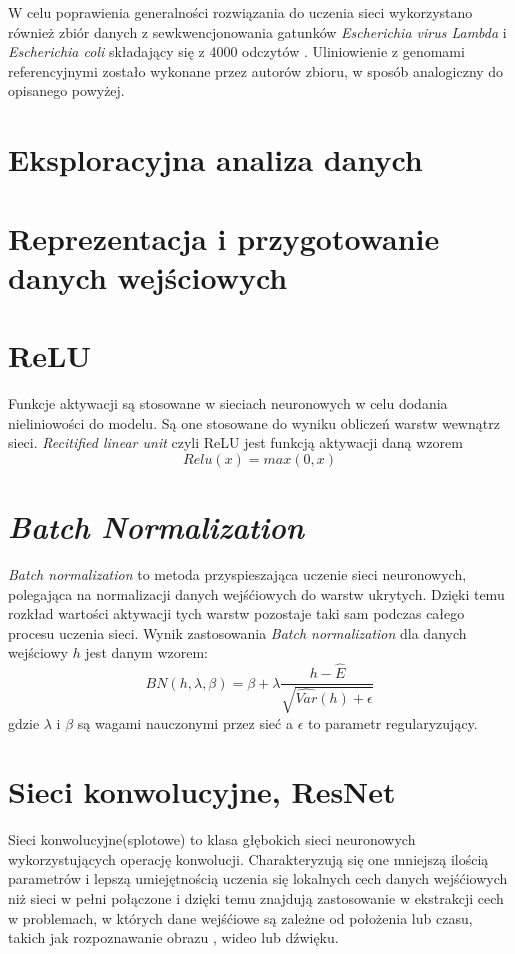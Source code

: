 \documentclass[a4paper,11pt,twoside]{report}
\theoremstyle{definition}
\begin{document}
W celu poprawienia generalności rozwiązania do uczenia sieci wykorzystano również zbiór danych z sewkwencjonowania gatunków \textit{Escherichia virus Lambda} i \textit{Escherichia coli} składający się z 4000 odczytów \cite{chironData}. Uliniowienie z genomami referencyjnymi zostało wykonane przez autorów zbioru, w sposób analogiczny do opisanego powyżej.

\section*{Eksploracyjna analiza danych}

\section*{Reprezentacja i przygotowanie danych wejściowych}

\section{ReLU}

Funkcje aktywacji są stosowane w sieciach neuronowych w celu dodania nieliniowości do modelu. Są one stosowane do wyniku obliczeń warstw wewnątrz sieci. \textit{Recitified linear unit} czyli ReLU jest funkcją aktywacji daną wzorem
\[Relu(x) = max(0,x)\]

\section{\textit{Batch Normalization}}

\textit{Batch normalization} to metoda przyspieszająca uczenie sieci neuronowych, polegająca na normalizacji danych wejśćiowych do warstw ukrytych. Dzięki temu rozkład wartości aktywacji tych warstw pozostaje taki sam podczas całego procesu uczenia sieci. Wynik zastosowania \textit{Batch normalization } dla danych wejściowy $h$ jest danym wzorem:
\[BN(h, \lambda, \beta)=\beta+\lambda\frac{h-\hat{E}}{\sqrt{\hat{Var}(h)+\epsilon}}\]
gdzie $\lambda$ i $\beta$ są wagami nauczonymi przez sieć a $\epsilon$ to parametr regularyzujący.

\section*{Sieci konwolucyjne, ResNet}

Sieci konwolucyjne(splotowe) to klasa głębokich sieci neuronowych wykorzystujących operację konwolucji. Charakteryzują się one mniejszą ilością parametrów i lepszą umiejętnością uczenia się lokalnych cech danych wejśćiowych niż sieci w pełni połączone\cite{cnn} i dzięki temu znajdują zastosowanie w ekstrakcji cech w problemach, w których dane wejśćiowe są zależne od położenia lub czasu, takich jak rozpoznawanie obrazu \cite{vgg}, wideo\cite{cnnVideo} lub dźwięku\cite{cnnAudio}.
\end{document}
